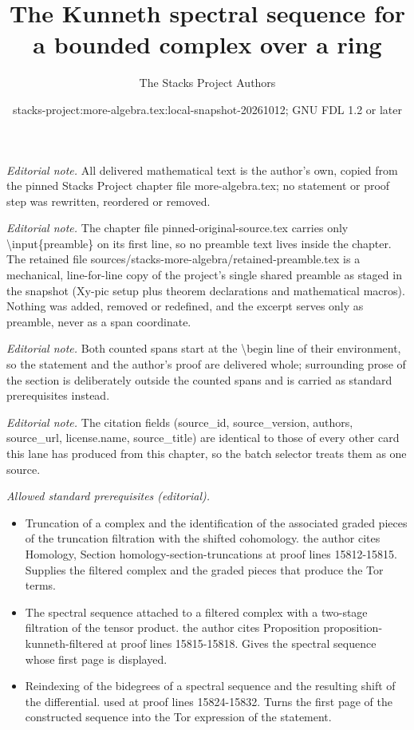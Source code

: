 \documentclass[10pt,a4paper]{amsart}
\title{The Kunneth spectral sequence for a bounded complex over a ring}
\author{The Stacks Project Authors}
\date{stacks-project:more-algebra.tex:local-snapshot-20261012; GNU FDL 1.2 or later}
\theoremstyle{plain}
\theoremstyle{definition}
\theoremstyle{remark}
\numberwithin{equation}{subsection}
\begin{document}
\maketitle
\setcounter{subsection}{1}
\noindent\textit{Editorial note.} All delivered mathematical text is the author's own, copied from the pinned Stacks Project chapter file more-algebra.tex; no statement or proof step was rewritten, reordered or removed.\par\medskip
\noindent\textit{Editorial note.} The chapter file pinned-original-source.tex carries only \textbackslash{}input\{preamble\} on its first line, so no preamble text lives inside the chapter. The retained file sources/stacks-more-algebra/retained-preamble.tex is a mechanical, line-for-line copy of the project's single shared preamble as staged in the snapshot (Xy-pic setup plus theorem declarations and mathematical macros). Nothing was added, removed or redefined, and the excerpt serves only as preamble, never as a span coordinate.\par\medskip
\noindent\textit{Editorial note.} Both counted spans start at the \textbackslash{}begin line of their environment, so the statement and the author's proof are delivered whole; surrounding prose of the section is deliberately outside the counted spans and is carried as standard prerequisites instead.\par\medskip
\noindent\textit{Editorial note.} The citation fields (source\_id, source\_version, authors, source\_url, license.name, source\_title) are identical to those of every other card this lane has produced from this chapter, so the batch selector treats them as one source.\par\medskip
\noindent\textit{Allowed standard prerequisites (editorial).}\begin{itemize}
\item Truncation of a complex and the identification of the associated graded pieces of the truncation filtration with the shifted cohomology. the author cites Homology, Section homology-section-truncations at proof lines 15812-15815. Supplies the filtered complex and the graded pieces that produce the Tor terms.
\item The spectral sequence attached to a filtered complex with a two-stage filtration of the tensor product. the author cites Proposition proposition-kunneth-filtered at proof lines 15815-15818. Gives the spectral sequence whose first page is displayed.
\item Reindexing of the bidegrees of a spectral sequence and the resulting shift of the differential. used at proof lines 15824-15832. Turns the first page of the constructed sequence into the Tor expression of the statement.
\end{itemize}\medskip
\end{document}
